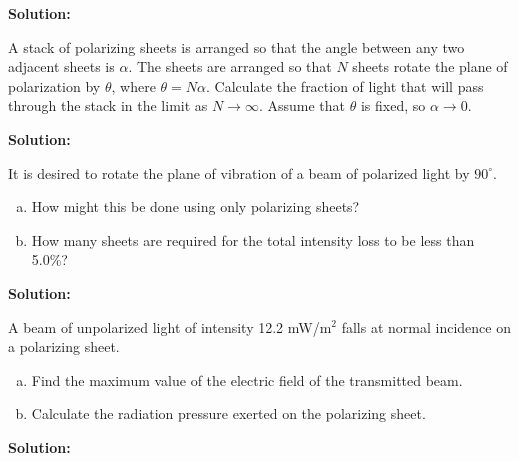 \documentclass[11pt]{article}
\newcommand{\be}{\begin{enumerate}[a) ]}
\newcommand{\ee}{\end{enumerate}}
\begin{document}
\textbf{Solution:}\\

\clearpage

\begin{problem}[(P44.3)]
A stack of polarizing sheets is arranged so that the angle between any two adjacent sheets is $\alpha$.
The sheets are arranged so that $N$ sheets rotate the plane of polarization by $\theta$, where $\theta = N \alpha$.
Calculate the fraction of light that will pass through the stack in the limit as $N \to \infty$. Assume
that $\theta$ is fixed, so $\alpha \to 0$.
\end{problem}


\textbf{Solution:}\\

\clearpage

\begin{problem}[(P44.4)]
It is desired to rotate the plane of vibration of a beam of polarized light by $90^{\circ}$.
\be
\item How might this be done using only polarizing sheets?
\item How many sheets are required for the total intensity loss to be less than 5.0\%?
\ee
\end{problem}


\textbf{Solution:}\\

\clearpage

\begin{problem}[(E44.3)]
A beam of unpolarized light of intensity 12.2 mW/$\text{m}^2$
falls at normal incidence on a polarizing
sheet.
\be
\item Find the maximum value of the electric field of the transmitted beam.
\item Calculate the radiation pressure exerted on the polarizing sheet.
\ee
\end{problem}


\textbf{Solution:}\\
\end{document}
